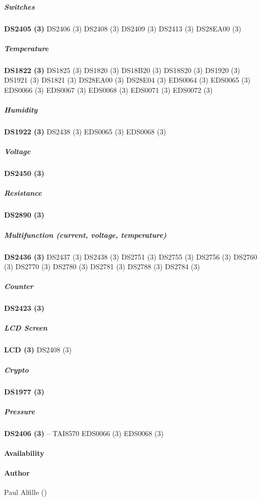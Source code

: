 \subparagraph*{Switches}\textsf{\textbf{DS2405 (3)} \textsf{DS2406 (3)} \textsf{DS2408 (3)} \textsf{DS2409 (3)} \textsf{DS2413 (3)} \textsf{DS28EA00
(3)}} 
\subparagraph*{Temperature}\textsf{\textbf{DS1822 (3)} \textsf{DS1825 (3)} \textsf{DS1820 (3)} \textsf{DS18B20 (3)} \textsf{DS18S20 (3)}
\textsf{DS1920 (3)} \textsf{DS1921 (3)} \textsf{DS1821 (3)} \textsf{DS28EA00 (3)} \textsf{DS28E04 (3)} \textsf{EDS0064 (3)} \textsf{EDS0065
(3)} \textsf{EDS0066 (3)} \textsf{EDS0067 (3)} \textsf{EDS0068 (3)} \textsf{EDS0071 (3)} \textsf{EDS0072 (3)}} 
\subparagraph*{Humidity}\textsf{\textbf{DS1922
(3)} \textsf{DS2438 (3)} \textsf{EDS0065 (3)} \textsf{EDS0068 (3)}} 
\subparagraph*{Voltage}\textsf{\textbf{DS2450 (3)}} 
\subparagraph*{Resistance}\textsf{\textbf{DS2890
(3)}} 
\subparagraph*{Multifunction (current, voltage, temperature)}\textsf{\textbf{DS2436 (3)} \textsf{DS2437 (3)}
\textsf{DS2438 (3)} \textsf{DS2751 (3)} \textsf{DS2755 (3)} \textsf{DS2756 (3)} \textsf{DS2760 (3)} \textsf{DS2770 (3)} \textsf{DS2780
(3)} \textsf{DS2781 (3)} \textsf{DS2788 (3)} \textsf{DS2784 (3)}} 
\subparagraph*{Counter}\textsf{\textbf{DS2423 (3)}} 
\subparagraph*{LCD Screen}\textsf{\textbf{LCD (3)}
\textsf{DS2408 (3)}} 
\subparagraph*{Crypto}\textsf{\textbf{DS1977 (3)}} 
\subparagraph*{Pressure}\textsf{\textbf{DS2406 (3)} -- TAI8570 \textsf{EDS0066 (3)} \textsf{EDS0068
(3)}}  
\paragraph*{Availability}
\paragraph*{Author}
Paul Alfille ()
